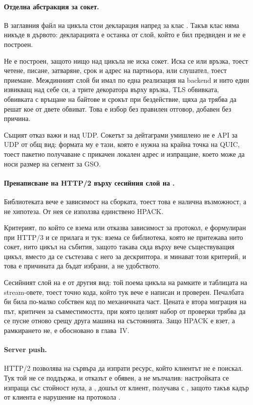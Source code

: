 \paragraph{Отделна абстракция за сокет.} В заглавния файл на цикъла стои декларация напред
за клас . Такъв клас няма никъде в дървото: декларацията е останка от слой,
който е бил предвиден и не е построен.

Не е построен, защото нищо над цикъла не иска сокет. Иска се или връзка, тоест четене,
писане, затваряне, срок и адрес на партньора, или слушател, тоест приемане. Междинният слой
би имал по една реализация на backend и нито един извикващ над себе си, а трите декоратора
върху връзка, TLS обвивката, обвивката с връщане на байтове и срокът при бездействие, щяха
да трябва да решат кое от двете обвиват. Това е избор без правилен отговор, добавен без
причина.

Същият отказ важи и над UDP. Сокетът за дейтаграми умишлено не е API за UDP от общ вид:
формата му е тази, която е нужна на крайна точка на QUIC, тоест пакетно получаване с
прикачен локален адрес и изпращане, което може да носи размер на сегмент за GSO.

\paragraph{Пренаписване на HTTP/2 върху сесийния слой на .} Библиотеката вече
е зависимост на сборката, тоест това е налична възможност, а не хипотеза. От нея се използва
единствено HPACK.

Критерият, по който се взема или отказва зависимост за протокол, е формулиран при HTTP/3 и
се прилага и тук: взема се библиотека, която не притежава нито сокет, нито цикъл на събития,
защото такава сяда върху вече съществуващия цикъл, вместо да се състезава с него за
дескриптора.  и  минават този критерий, и това е причината да
бъдат избрани, а не удобството.

Сесийният слой на  е от другия вид: той поема цикъла на рамките и таблицата
на stream-овете, тоест точно кода, който тук вече е написан и проверен. Печалбата би била
по-малко собствен код по механичната част. Цената е втора миграция на път, критичен за
съвместимостта, при която целият набор от проверки трябва да се пусне отново срещу друга
машина на състоянията. Защо HPACK е взет, а рамкирането не, е обосновано в глава~IV.

\paragraph{Server push.} HTTP/2 позволява на сървъра да изпрати ресурс, който клиентът не е
поискал. Тук той не се поддържа, и отказът е обявен, а не мълчалив: настройката
 се изпраща със стойност нула, а , дошъл
от клиент, получава  с , защото такъв кадър от клиента е
нарушение на протокола \cite{rfc9113}.

